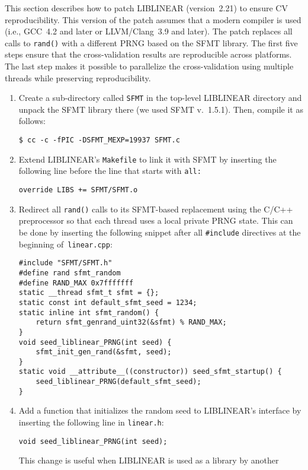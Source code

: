 This section describes how to patch LIBLINEAR (version~2.21) to ensure CV
reproducibility. This version of the patch assumes that a modern compiler is
used (i.e., GCC~4.2 and later or LLVM/Clang~3.9 and later). The patch replaces
all calls to \texttt{rand()} with a different PRNG based on the SFMT
library\supercite{saito2008simd}. The first five steps ensure that the
cross-validation results are reproducible across platforms. The last step makes
it possible to parallelize the cross-validation using multiple threads while
preserving reproducibility.
\begin{enumerate}
\item Create a sub-directory called \verb|SFMT| in the top-level LIBLINEAR
  directory and unpack the SFMT library there (we used SFMT
  v.~1.5.1). Then, compile it as follows:
\begin{Verbatim}[fontsize=\small]
$ cc -c -fPIC -DSFMT_MEXP=19937 SFMT.c
\end{Verbatim}
\item Extend LIBLINEAR's \verb|Makefile| to link it with SFMT by inserting the
  following line before the line that starts with \verb|all:|
\begin{Verbatim}[fontsize=\small]
override LIBS += SFMT/SFMT.o
\end{Verbatim}
\item Redirect all \verb|rand()| calls to its SFMT-based replacement using
  the C/C++ preprocessor so that each thread uses a local private PRNG state. This can be done by inserting the following snippet after all
  \verb|#include| directives at the beginning of~\verb|linear.cpp|:
\begin{Verbatim}[fontsize=\small]
#include "SFMT/SFMT.h"
#define rand sfmt_random
#define RAND_MAX 0x7fffffff
static __thread sfmt_t sfmt = {};
static const int default_sfmt_seed = 1234;
static inline int sfmt_random() {
    return sfmt_genrand_uint32(&sfmt) % RAND_MAX;
}
void seed_liblinear_PRNG(int seed) {
    sfmt_init_gen_rand(&sfmt, seed);
}
static void __attribute__((constructor)) seed_sfmt_startup() {
    seed_liblinear_PRNG(default_sfmt_seed);
}
\end{Verbatim}
\item Add a function that initializes the random seed to LIBLINEAR's interface by
  inserting the following line in \verb|linear.h|:
\begin{Verbatim}[fontsize=\small]
void seed_liblinear_PRNG(int seed);
\end{Verbatim}
  This change is useful when LIBLINEAR is used as a library by another

\end{enumerate}
